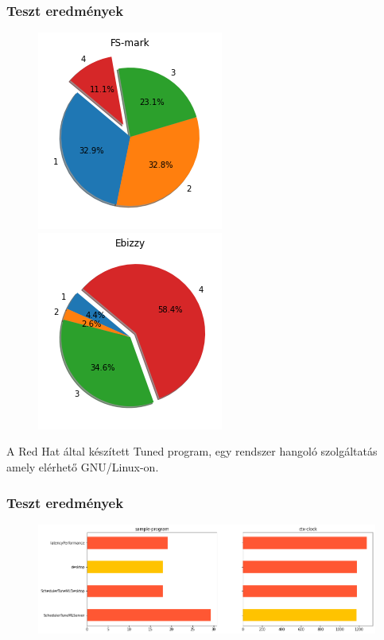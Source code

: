 \documentclass{beamer}
\begin{document}
\begin{frame}
\frametitle{Teszt eredmények}

\begin{figure}
	\begin{center}
		\includegraphics[height=0.62\textheight]{images/diskBenchmarkValue.png}
		\includegraphics[height=0.62\textheight]{images/cpuBenchmarkValue.png}
	\end{center}	
\end{figure} 

\end{frame}


\begin{frame}
A Red Hat által készített Tuned program, egy rendszer hangoló szolgáltatás amely elérhető GNU/Linux-on.
\frametitle{Teszt eredmények}
\begin{figure}
	\begin{center}
		\includegraphics[height=0.4\textheight]{images/tunedAndSchedulerTuneMLCompareSampleprogramCtxclock.png}
	\end{center}	
\end{figure} 
\end{frame}
\end{document}
